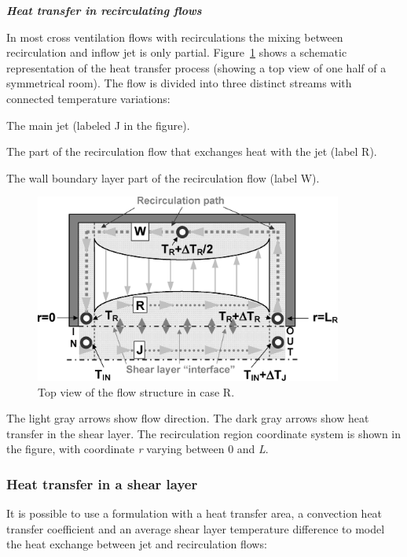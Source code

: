 \textbf{\emph{Heat transfer in recirculating flows}}

In most cross ventilation flows with recirculations the mixing between recirculation and inflow jet is only partial. Figure~\ref{fig:top-view-of-the-flow-structure-in-case-r.} shows a schematic representation of the heat transfer process (showing a top view of one half of a symmetrical room). The flow is divided into three distinct streams with connected temperature variations:

The main jet (labeled J in the figure).

The part of the recirculation flow that exchanges heat with the jet (label R).

The wall boundary layer part of the recirculation flow (label W).

\begin{figure}[hbtp] %
\centering
\includegraphics[width=0.9\textwidth, height=0.9\textheight, keepaspectratio=true]{media/image2663.png}
\caption{Top view of the flow structure in case R. \protect \label{fig:top-view-of-the-flow-structure-in-case-r.}}
\end{figure}

The light gray arrows show flow direction. The dark gray arrows show heat transfer in the shear layer. The recirculation region coordinate system is shown in the figure, with coordinate \emph{r} varying between 0 and \emph{L}.

\subsubsection{Heat transfer in a shear layer}\label{heat-transfer-in-a-shear-layer}

It is possible to use a formulation with a heat transfer area, a convection heat transfer coefficient and an average shear layer temperature difference to model the heat exchange between jet and recirculation flows:

